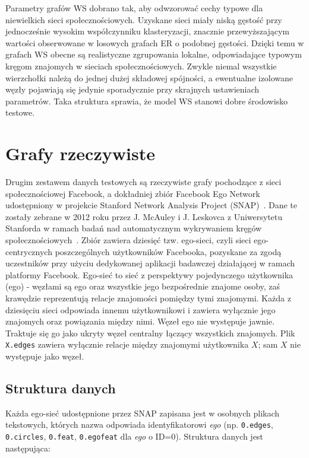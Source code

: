 Parametry grafów WS dobrano tak, aby odwzorować cechy typowe dla niewielkich sieci społecznościowych. Uzyskane sieci miały niską gęstość przy jednocześnie wysokim współczynniku klasteryzacji, znacznie przewyższającym wartości obserwowane w losowych grafach ER o podobnej gęstości. Dzięki temu w grafach WS obecne są realistyczne zgrupowania lokalne, odpowiadające typowym kręgom znajomych w sieciach społecznościowych. Zwykle niemal wszystkie wierzchołki należą do jednej dużej składowej spójności, a ewentualne izolowane węzły pojawiają się jedynie sporadycznie przy skrajnych ustawieniach parametrów. Taka struktura sprawia, że model WS stanowi dobre środowisko testowe.

\section{Grafy rzeczywiste}
Drugim zestawem danych testowych są rzeczywiste grafy pochodzące z sieci społecznościowej Facebook,
a dokładniej zbiór Facebook Ego Network udostępniony w projekcie Stanford Network Analysis Project (SNAP)~\cite{snapnets}.
Dane te zostały zebrane w 2012 roku przez J. McAuley i J. Leskovca z Uniwersytetu Stanforda w ramach badań nad automatycznym wykrywaniem kręgów społecznościowych~\cite{McAuley2012}. Zbiór zawiera dziesięć tzw. ego-sieci, czyli sieci ego-centrycznych poszczególnych użytkowników Facebooka, pozyskane za zgodą uczestników przy użyciu dedykowanej aplikacji badawczej działającej w ramach platformy Facebook. Ego-sieć to sieć z perspektywy pojedynczego użytkownika (ego) - węzłami są ego oraz wszystkie jego bezpośrednie znajome osoby, zaś krawędzie reprezentują relacje znajomości pomiędzy tymi znajomymi. Każda z dziesięciu sieci odpowiada innemu użytkownikowi i zawiera wyłącznie jego znajomych oraz powiązania między nimi. Węzeł ego nie występuje jawnie. Traktuje się go jako ukryty węzeł centralny łączący wszystkich znajomych. Plik \verb|X.edges| zawiera wyłącznie relacje między znajomymi użytkownika $X$; sam $X$ nie występuje jako węzeł.

\subsection{Struktura danych}

Każda ego-sieć udostępnione przez SNAP zapisana jest w osobnych plikach tekstowych, których nazwa odpowiada identyfikatorowi \textit{ego} (np. \verb|0.edges|, \verb|0.circles|, \verb|0.feat|, \verb|0.egofeat| dla \textit{ego} o ID=0). Struktura danych jest następująca:

